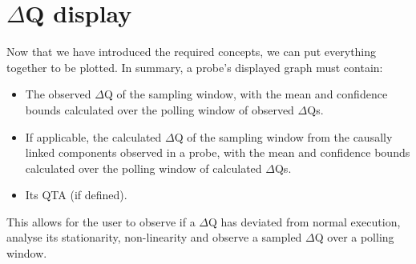 \section{$\Delta$Q display}
    Now that we have introduced the required concepts, we can put everything together to be plotted. In summary, a probe's displayed graph must contain:
    \begin{itemize}
        \item The observed $\Delta$Q of the sampling window, with the mean and confidence bounds calculated over the polling window of observed $\Delta$Qs.
        \item If applicable, the calculated $\Delta$Q of the sampling window from the causally linked components observed in a probe, with the mean and confidence bounds calculated over the polling window of calculated $\Delta$Qs.
        \item Its QTA (if defined).
    \end{itemize}
    This allows for the user to observe if a $\Delta$Q has deviated from normal execution, analyse its stationarity, non-linearity and observe a sampled $\Delta$Q over a polling window.

